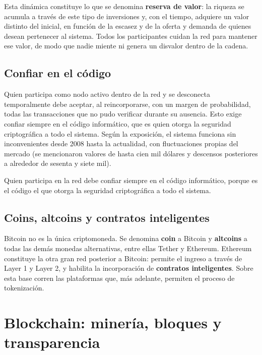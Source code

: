 \documentclass[12pt,oneside]{book}
\begin{document}
Esta dinámica constituye lo que se denomina \textbf{reserva de valor}: la riqueza se acumula a través de este tipo de inversiones y, con el tiempo, adquiere un valor distinto del inicial, en función de la escasez y de la oferta y demanda de quienes desean pertenecer al sistema. Todos los participantes cuidan la red para mantener ese valor, de modo que nadie miente ni genera un disvalor dentro de la cadena.

\section{Confiar en el código}

Quien participa como nodo activo dentro de la red y se desconecta temporalmente debe aceptar, al reincorporarse, con un margen de probabilidad, todas las transacciones que no pudo verificar durante su ausencia. Esto exige confiar siempre en el código informático, que es quien otorga la seguridad criptográfica a todo el sistema. Según la exposición, el sistema funciona sin inconvenientes desde 2008 hasta la actualidad, con fluctuaciones propias del mercado (se mencionaron valores de hasta cien mil dólares y descensos posteriores a alrededor de sesenta y siete mil).

\begin{important}
Quien participa en la red debe confiar siempre en el código informático, porque es el código el que otorga la seguridad criptográfica a todo el sistema.
\end{important}

\section{Coins, altcoins y contratos inteligentes}

Bitcoin no es la única criptomoneda. Se denomina \textbf{coin} a Bitcoin y \textbf{altcoins} a todas las demás monedas alternativas, entre ellas Tether y Ethereum. Ethereum constituye la otra gran red posterior a Bitcoin: permite el ingreso a través de Layer 1 y Layer 2, y habilita la incorporación de \textbf{contratos inteligentes}. Sobre esta base corren las plataformas que, más adelante, permiten el proceso de tokenización.

\chapter{Blockchain: minería, bloques y transparencia}
\end{document}

